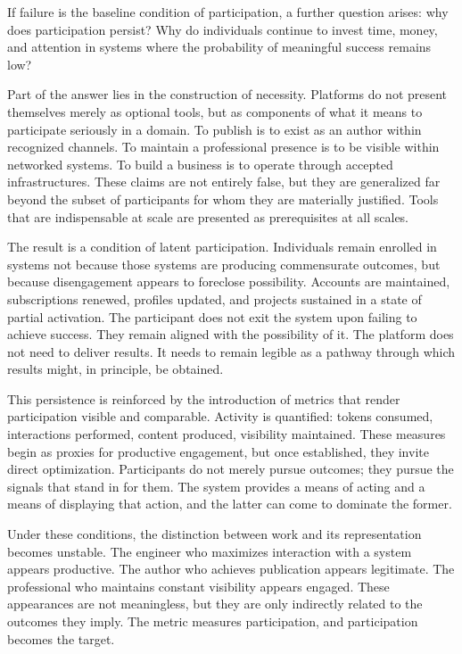\documentclass[12pt, a4paper]{article}
\begin{document}
If failure is the baseline condition of participation, a further question arises: why does participation persist? Why do individuals continue to invest time, money, and attention in systems where the probability of meaningful success remains low?

Part of the answer lies in the construction of necessity. Platforms do not present themselves merely as optional tools, but as components of what it means to participate seriously in a domain. To publish is to exist as an author within recognized channels. To maintain a professional presence is to be visible within networked systems. To build a business is to operate through accepted infrastructures. These claims are not entirely false, but they are generalized far beyond the subset of participants for whom they are materially justified. Tools that are indispensable at scale are presented as prerequisites at all scales.

The result is a condition of latent participation. Individuals remain enrolled in systems not because those systems are producing commensurate outcomes, but because disengagement appears to foreclose possibility. Accounts are maintained, subscriptions renewed, profiles updated, and projects sustained in a state of partial activation. The participant does not exit the system upon failing to achieve success. They remain aligned with the possibility of it. The platform does not need to deliver results. It needs to remain legible as a pathway through which results might, in principle, be obtained.

This persistence is reinforced by the introduction of metrics that render participation visible and comparable. Activity is quantified: tokens consumed, interactions performed, content produced, visibility maintained. These measures begin as proxies for productive engagement, but once established, they invite direct optimization. Participants do not merely pursue outcomes; they pursue the signals that stand in for them. The system provides a means of acting and a means of displaying that action, and the latter can come to dominate the former.

Under these conditions, the distinction between work and its representation becomes unstable. The engineer who maximizes interaction with a system appears productive. The author who achieves publication appears legitimate. The professional who maintains constant visibility appears engaged. These appearances are not meaningless, but they are only indirectly related to the outcomes they imply. The metric measures participation, and participation becomes the target.
\end{document}
